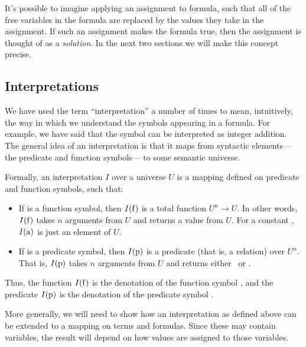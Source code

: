 It's possible to imagine applying an assignment to formula,
such that all of the free variables in the formula
are replaced by the values they take in the assignment.
If such an assignment makes the formula true,
then the assignment is thought of as a
\emph{solution\label{gi:solution}}.
In the next two sections we will make this concept precise.


\subsection{Interpretations}
\label{sec:interpretations}

We have used the term ``interpretation'' a number of times to mean,
intuitively, the way in which we understand
the symbols appearing in a formula.
For example,
we have said that the symbol \co{+} can be interpreted as integer addition.
The general idea of an interpretation is that
it maps from syntactic elements---the predicate and function symbols---%
to some semantic universe.

Formally, an interpretation $I$ over a universe $U$
is a mapping defined on predicate and function symbols, such that:
\begin{itemize}
\item
If  is a function symbol,
then $I(\operatorname{f})$ is a total function $U^n \rightarrow U$.
In other words,
$I(\operatorname{f})$ takes $n$ arguments from $U$
and returns a value from $U$.
For a constant ,
$I(\operatorname{a})$ is just an element of $U$.
\item
If  is a predicate symbol,
then $I(\operatorname{p})$ is a predicate (that is, a relation) over $U^n$.
That is,
$I(\operatorname{p})$ takes $n$ arguments from $U$
and returns either \true\ or \false.
\end{itemize}
Thus,
the function $I(\operatorname{f})$
is the denotation of the function symbol ,
and the predicate $I(\operatorname{p})$
is the denotation of the predicate symbol .

More generally,
we will need to show how an interpretation as defined above
can be extended to a mapping on terms and formulas.
Since these may contain variables,
the result will depend on how values are assigned to those variables.

